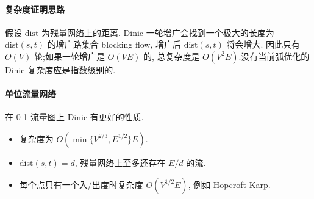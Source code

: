 \paragraph{复杂度证明思路}
假设 $\mathrm{dist}$ 为残量网络上的距离.
Dinic 一轮增广会找到一个极大的长度为 $\mathrm{dist} (s, t)$ 的增广路集合 blocking flow, 增广后 $\mathrm{dist} (s, t)$ 将会增大.
因此只有 $O(V)$ 轮;如果一轮增广是 $O(VE)$ 的,
总复杂度是 $O(V^2E)$.没有当前弧优化的 Dinic 复杂度应是指数级别的.

\paragraph{单位流量网络}
在 0-1 流量图上 Dinic 有更好的性质. 
\begin{itemize}
	\setlength{\itemsep}{0pt}
	\setlength{\parskip}{0pt}
	\setlength{\parsep}{0pt}
	\item 复杂度为 $O(\min \{V ^ {2/3}, E ^ {1/2}\} E)$.
	\item $\mathrm{dist} (s, t) = d$, 残量网络上至多还存在 $E/d$ 的流.
	\item 每个点只有一个入/出度时复杂度 $O(V ^ {1 /2 } E)$, 例如 Hopcroft-Karp.
\end{itemize}
